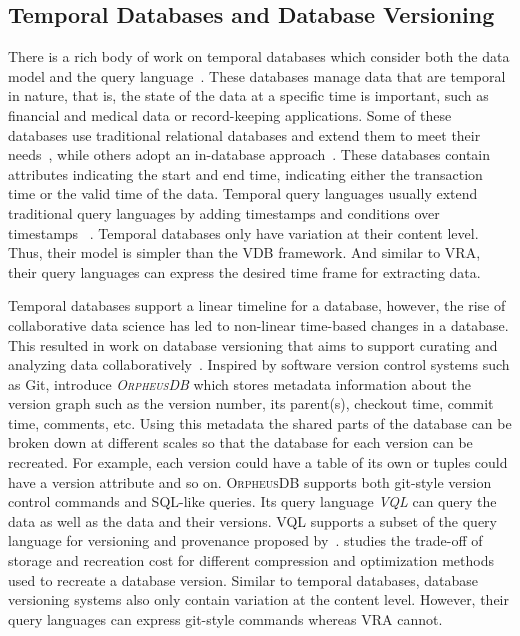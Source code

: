 \subsection{Temporal Databases and Database Versioning}
\label{sec:db-ver}

There is a rich body of work on temporal databases which consider both the data model and the query language~\cite{tempDataMng, tempDBSurv, tempDBbook}.
These databases manage data that are temporal in nature, that is, the state of the data at a specific
time is important, such as financial and medical data or record-keeping applications. 
%
Some of these databases use traditional relational databases and extend them to meet their 
needs~\cite{stratum,Teradata, db2}, while others adopt an in-database 
approach~\cite{KaufmannMVFKFM13sigmod}.
%
These databases contain attributes indicating the start and end time, indicating either 
the transaction time or the valid time of the data. Temporal query languages usually extend 
traditional query languages by adding timestamps and conditions over 
timestamps ~\cite{chomicki95,Jensen2009,evalTempLang}.
%
Temporal databases only have variation at their content level. Thus, their model is simpler 
than the VDB framework. And similar to VRA, their query languages can express
the desired time frame for extracting data. 


Temporal databases support a linear timeline for a database, however, the rise of collaborative data 
science has led to non-linear time-based changes in a database. 
This resulted in work on database versioning that aims to support curating and analyzing data 
collaboratively~\cite{datahub15cidr}. Inspired by software version control systems such as Git, 
\citet{dbVersioning} introduce \emph{\textsc{OrpheusDB}} which stores metadata information
about the version graph such as 
the version number, its parent(s), checkout time, commit time, comments, etc. 
Using this metadata the shared parts of the database can be broken down at different scales so
that the database for each version can be recreated.
For example, each version could have a table of its own or 
tuples could have a version attribute and so on. 
\textsc{OrpheusDB} supports both git-style version control 
commands and SQL-like queries. Its query language \emph{VQL} can query the data 
as well as the data and their versions. VQL supports a subset of the query language for 
versioning and provenance proposed by~\citet{vqlAndProv}. 
\citet{datasetVersioning} studies the trade-off of storage and recreation cost for 
different compression and optimization methods used to recreate a database version.
%
Similar to temporal databases, database versioning systems also only contain variation
at the content level. However, their query languages can express git-style commands
whereas VRA cannot. 


